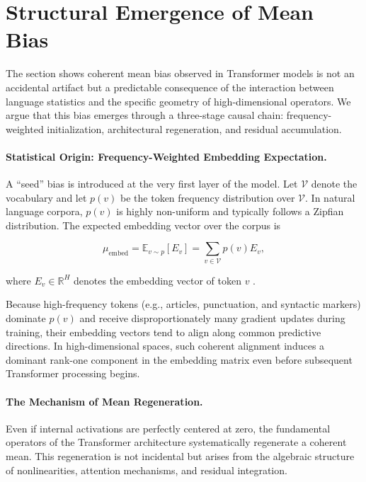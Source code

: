 \section{Structural Emergence of Mean Bias}

The section shows coherent mean bias observed in Transformer models is not an accidental artifact but a predictable consequence of the interaction between language statistics and the specific geometry of high-dimensional operators. We argue that this bias emerges through a three-stage causal chain: frequency-weighted initialization, architectural regeneration, and residual accumulation.

\paragraph{Statistical Origin: Frequency-Weighted Embedding Expectation.}

A ``seed'' bias is introduced at the very first layer of the model.
Let $\mathcal{V}$ denote the vocabulary and let $p(v)$ be the token frequency
distribution over $\mathcal{V}$.
In natural language corpora, $p(v)$ is highly non-uniform and typically
follows a Zipfian distribution.
The expected embedding vector over the corpus is

\begin{equation}
\mu_{\text{embed}}
=
\mathbb{E}_{v \sim p}[E_v]
=
\sum_{v \in \mathcal{V}} p(v) E_v,
\label{eq:embedding_mean}
\end{equation}

where $E_v \in \mathbb{R}^H$ denotes the embedding vector of token $v$
\cite{mikolov2013efficient,mikolov2013distributed,arora2017simple}.

Because high-frequency tokens (e.g., articles, punctuation, and syntactic
markers) dominate $p(v)$ and receive disproportionately many gradient updates
during training, their embedding vectors tend to align along common predictive
directions.
In high-dimensional spaces, such coherent alignment induces a dominant
rank-one component in the embedding matrix even before subsequent Transformer
processing begins.

\paragraph{The Mechanism of Mean Regeneration.}

Even if internal activations are perfectly centered at zero,
the fundamental operators of the Transformer architecture
systematically regenerate a coherent mean.
This regeneration is not incidental but arises from
the algebraic structure of nonlinearities,
attention mechanisms, and residual integration.

